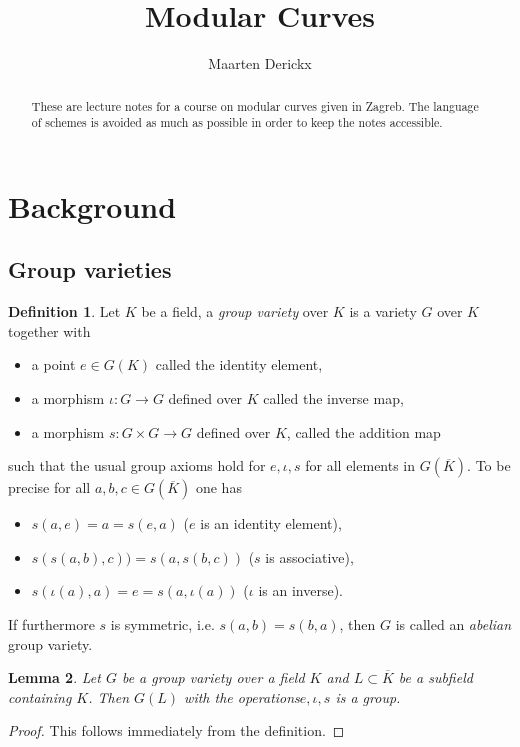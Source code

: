 \documentclass[a4paper,12pt,reqno]{amsart}
\title{Modular Curves}
\author{Maarten Derickx}
\newtheorem{lemma}{Lemma}
\theoremstyle{definition}
\newtheorem{definition}[lemma]{Definition}
\numberwithin{lemma}{section}
\numberwithin{equation}{section}
\numberwithin{figure}{section}
\begin{document}
\begin{abstract}
These are lecture notes for a course on modular curves given in Zagreb. The language of schemes is avoided as much as possible in order to keep the notes accessible.
\end{abstract}

\maketitle


\section{Background}

\subsection{Group varieties}
\begin{definition}\label{def:group-variety}
Let $K$ be a field, a \textit{group variety} over $K$ is a variety $G$ over $K$ together with 
\begin{itemize}
	\item a point $e \in G(K)$ called the identity element,
	\item a morphism $\iota: G \to G$ defined over $K$ called the inverse map,
	\item a morphism $s: G \times G \to G$ defined over $K$, called the addition map
\end{itemize}
such that the usual group axioms hold for $e, \iota, s$ for all elements in $G(\overline K)$. To be precise for all $a,b,c \in G(\overline K)$ one has
\begin{itemize}
	\item $s(a,e)=a = s(e,a)$ ($e$ is an identity element),
	\item $s(s(a,b),c)) = s(a,s(b,c))$ ($s$ is associative),
	\item $s(\iota(a),a) = e = s(a, \iota(a))$ ($\iota$ is an inverse).
\end{itemize}
If furthermore $s$ is symmetric, i.e. $s(a,b)=s(b,a)$, then $G$ is called an \textit{abelian} group variety.
\end{definition}

\begin{lemma}\label{lem:group-structure-on-group-variety}
	Let $G$ be a group variety over a field $K$ and $L\subset \overline K$ be a subfield containing $K$. Then $G(L)$ with the operations$e,\iota, s$ is a group.
\end{lemma}
\begin{proof}
	This follows immediately from the definition.
\end{proof}
\end{document}
